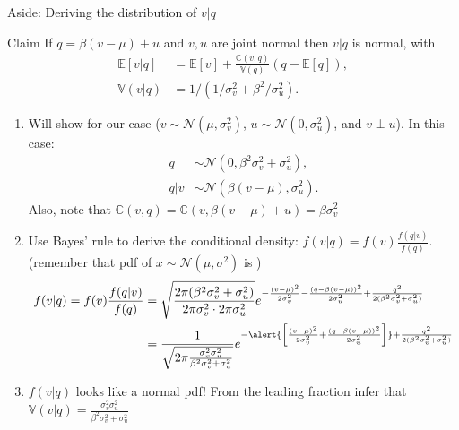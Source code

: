 \documentclass[english,10pt
,aspectratio=169
]{beamer}
\begin{document}
\begin{frame}{Aside: Deriving the distribution of $v|q$}
	\begin{block}{Claim}
		If $q=\beta(v-\mu) + u$ and $v,u$ are joint normal then $v|q$ is normal, with
		\begin{align*}
			\mathbb{E}[v|q] &= \mathbb{E}[v] + \frac{\mathbb{C}(v,q)}{\mathbb{V}(q)} (q-\mathbb{E}[q]),
			\\
			\mathbb{V}(v|q) &= 1/(1/\sigma^2_v + \beta^2 / \sigma^2_u).
		\end{align*}
	\end{block}
	\begin{enumerate}
		\item Will show for our case ($v \sim \mathcal{N}(\mu, \sigma^2_v)$, $u \sim \mathcal{N}(0, \sigma^2_u)$, and $v \perp u$). In this case:
		\begin{align*}
			q    & \sim \mathcal{N}(0, \beta^2 \sigma^2_v+\sigma^2_u),
			\\
			q|v & \sim \mathcal{N}(\beta(v-\mu), \sigma^2_u).
		\end{align*}
		Also, note that $\mathbb{C}(v,q)= \mathbb{C}(v, \beta(v-\mu)+u)=\beta\sigma^2_v$
	\end{enumerate}
\end{frame}


\begin{frame}%
	\begin{enumerate}
		\setcounter{enumi}{1}
		\item Use Bayes' rule to derive the conditional density: $f(v|q) = f(v) \frac{f(q|v)}{f(q)} $.
		\\
		(remember that pdf of $x \sim \mathcal{N}(\mu,\sigma^2)$ is )
		\begin{align*}
			f(v|q) = f(v) \frac{f(q|v)}{f(q)} 
			&= \sqrt{\frac{2\pi (\beta^2 \sigma^2_v+\sigma^2_u)}{2 \pi \sigma^2_v \cdot 2 \pi \sigma^2_u}} e^{- \frac{(v-\mu)^2}{2\sigma^2_v} - \frac{(q-\beta(v-\mu))^2}{2\sigma^2_u } + \frac{q^2}{2(\beta^2 \sigma^2_v + \sigma^2_u)}}
			\\
			&= \frac{1}{\sqrt{2 \pi \frac{\sigma^2_v \sigma^2_u}{\beta^2 \sigma^2_v+\sigma^2_u}}} e^{-\alert{\left[ \frac{(v-\mu)^2}{2\sigma^2_v} + \frac{(q-\beta(v-\mu))^2}{2\sigma^2_u } \right]} + \frac{q^2}{2(\beta^2 \sigma^2_v + \sigma^2_u)}}
		\end{align*}
		\item $f(v|q)$ looks like a normal pdf! From the leading fraction infer that  $\mathbb{V}(v|q) = \frac{\sigma^2_v \sigma^2_u}{\beta^2 \sigma^2_v+\sigma^2_u}$
		
	\end{enumerate}
\end{frame}
\end{document}
